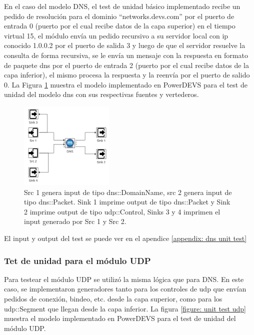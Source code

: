 \documentclass[10pt,a4paper]{article}
\begin{document}
En el caso del modelo DNS, el test de unidad básico implementado recibe un pedido de resolución para el dominio ``networks.devs.com'' por el puerto de entrada 0 (puerto por el cual recibe datos de la capa superior) en el tiempo virtual 15, el módulo envía un pedido recursivo a su servidor local con ip conocido 1.0.0.2 por el puerto de salida 3 y luego de que el servidor resuelve la consulta de forma recursiva, se le envía un mensaje con la respuesta en formato de paquete dns por el puerto de entrada 2 (puerto por el cual recibe datos de la capa inferior), el mismo procesa la respuesta y la reenvía por el puerto de salido 0. La Figura \ref{figure: unit test dns} muestra el modelo implementado en PowerDEVS para el test de unidad del modelo dns con sus respectivas fuentes y vertederos.

\begin{figure}[!h]
    \centering
    \includegraphics[width = 0.4\textwidth]{img/png/unit_tests/dns.png}
    \caption{Src 1 genera input de tipo dns::DomainName, src 2 genera input de tipo dns::Packet. Sink 1 imprime output de tipo dns::Packet y Sink 2 imprime output de tipo udp::Control, Sinks 3 y 4 imprimen el input generado por Src 1 y Src 2.}
    \label{figure: unit test dns}
\end{figure}

El input y output del test se puede ver en el apendice \ref{appendix: dns unit test}

\newpage

\subsubsection{Tet de unidad para el módulo UDP}

Para testear el módulo UDP se utilizó la misma lógica que para DNS. En este caso, se implementaron generadores tanto para los controles de udp que envían pedidos de conexión, bindeo, etc. desde la capa superior, como para los udp::Segment que llegan desde la capa inferior. La figura \ref{figure: unit test udp} muestra el modelo implementado en PowerDEVS para el test de unidad del módulo UDP. \\
\end{document}

